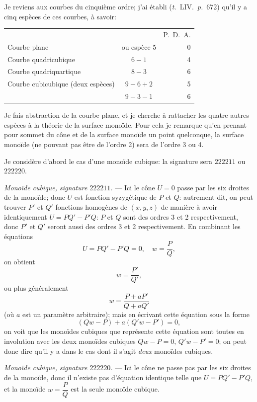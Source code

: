 \documentclass[11pt,a4paper]{article}
\newcommand{\tome}{\textit{t.}}
\newcommand{\page}{\textit{p.}}
\begin{document}
Je reviens aux courbes du cinqui\`{e}me ordre; j'ai \'{e}tabli (\tome~LIV.\ \page~672) qu'il y a cinq esp\`{e}ces de ces courbes, \`{a} savoir:
\begin{center}
\begin{tabular}{lcr}
 & & P.~D.~A. \\
Courbe plane & ou esp\`{e}ce 5 & 0 \\
Courbe quadricubique & $6 - 1$ & 4 \\
Courbe quadriquartique & $8 - 3$ & 6 \\
Courbe cubicubique (deux esp\`{e}ces) & $9 - 6 + 2$ & 5 \\
 & $9 - 3 - 1$ & 6 \\
\end{tabular}
\end{center}

\clearpage

Je fais abstraction de la courbe plane, et je cherche \`{a} rattacher les quatre autres esp\`{e}ces \`{a} la th\'{e}orie de la surface mono\"{i}de. Pour cela je remarque qu'en prenant pour sommet du c\^{o}ne et de la surface mono\"{i}de un point quelconque, la surface mono\"{i}de (ne pouvant pas \^{e}tre de l'ordre 2) sera de l'ordre 3 ou 4.

Je consid\`{e}re d'abord le cas d'une mono\"{i}de cubique: la signature sera $222211$ ou $222220$.

\medskip
\noindent\textit{Mono\"{i}de cubique, signature $222211$.} --- Ici le c\^{o}ne $U = 0$ passe par les six droites de la mono\"{i}de; donc $U$ est fonction syzyg\'{e}tique de $P$ et $Q$: autrement dit, on peut trouver $P'$ et $Q'$ fonctions homog\`{e}nes de $(x, y, z)$ de mani\`{e}re \`{a} avoir identiquement $U = PQ' - P'Q$: $P$ et $Q$ sont des ordres 3 et 2 respectivement, donc $P'$ et $Q'$ seront aussi des ordres 3 et 2 respectivement. En combinant les \'{e}quations
\[
U = PQ' - P'Q = 0, \quad w = \frac{P}{Q},
\]
on obtient
\[
w = \frac{P'}{Q'},
\]
ou plus g\'{e}n\'{e}ralement
\[
w = \frac{P + a P'}{Q + a Q'}
\]
(o\`{u} $a$ est un param\`{e}tre arbitraire); mais en \'{e}crivant cette \'{e}quation sous la forme
\[
(Qw - P) + a(Q'w - P') = 0,
\]
on voit que les mono\"{i}des cubiques que repr\'{e}sente cette \'{e}quation sont toutes en involution avec les deux mono\"{i}des cubiques $Qw - P = 0$, $Q'w - P' = 0$; on peut donc dire qu'il y a dans le cas dont il s'agit \textit{deux} mono\"{i}des cubiques.

\medskip
\noindent\textit{Mono\"{i}de cubique, signature $222220$.} --- Ici le c\^{o}ne ne passe pas par les six droites de la mono\"{i}de, donc il n'existe pas d'\'{e}quation identique telle que $U = PQ' - P'Q$, et la mono\"{i}de $w = \dfrac{P}{Q}$ est la seule mono\"{i}de cubique.
\end{document}
